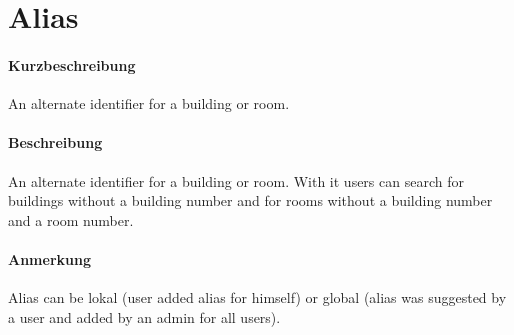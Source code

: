 \section{Alias}
\paragraph*{Kurzbeschreibung}
An alternate identifier for a building or room.
\paragraph*{Beschreibung}
An alternate identifier for a building or room. 
With it users can search for buildings without a building number and for rooms without a building number and a room number.
\paragraph*{Anmerkung}
Alias can be lokal (user added alias for himself) or global (alias was suggested by a user and added by an admin for all users).